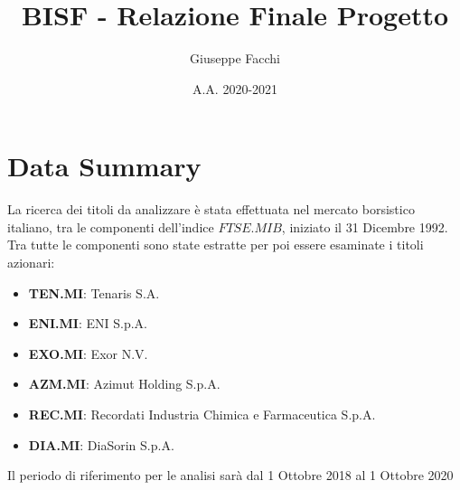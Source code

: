 \documentclass[12pt]{article}
\title{BISF - Relazione Finale Progetto}
\author{Giuseppe Facchi}
\date{A.A. 2020-2021}
\begin{document}
\maketitle
\newpage
\tableofcontents
\newpage

\section{Data Summary}
La ricerca dei titoli da analizzare è stata effettuata nel mercato borsistico italiano, tra le componenti dell'indice $FTSE.MIB$, iniziato il 31 Dicembre 1992.
Tra tutte le componenti sono state estratte per poi essere esaminate i titoli azionari:
\begin{itemize}
    \item \textbf{TEN.MI}: Tenaris S.A.
    \item \textbf{ENI.MI}: ENI S.p.A.
    \item \textbf{EXO.MI}: Exor N.V.
    \item \textbf{AZM.MI}: Azimut Holding S.p.A.
    \item \textbf{REC.MI}: Recordati Industria Chimica e Farmaceutica S.p.A.
    \item \textbf{DIA.MI}: DiaSorin S.p.A.
\end{itemize}
Il periodo di riferimento per le analisi sarà dal 1 Ottobre 2018 al 1 Ottobre 2020
\end{document}
